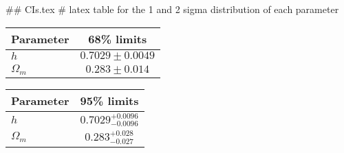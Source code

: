 ## CIs.tex
# latex table for the 1 and 2 sigma distribution of each parameter

\begin{tabular} { l  c}
 Parameter &  68\% limits\\
\hline
{\boldmath$h              $} & $0.7029\pm 0.0049          $\\
{\boldmath$\Omega_m       $} & $0.283\pm 0.014            $\\
\hline
\end{tabular}

\begin{tabular} { l  c}
 Parameter &  95\% limits\\
\hline
{\boldmath$h              $} & $0.7029^{+0.0096}_{-0.0096}$\\
{\boldmath$\Omega_m       $} & $0.283^{+0.028}_{-0.027}   $\\
\hline
\end{tabular}
